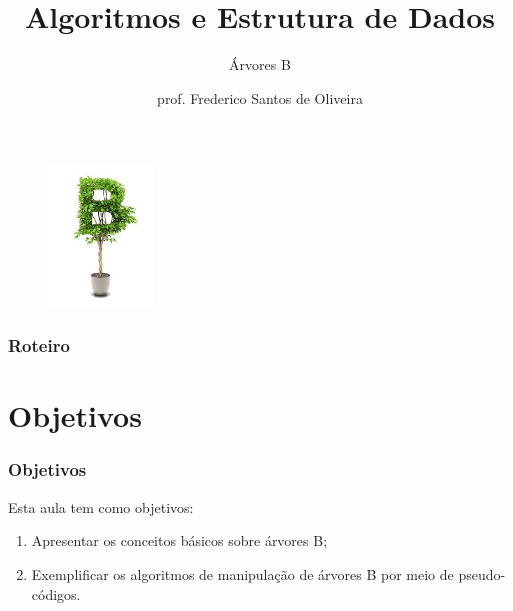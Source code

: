 \documentclass[aspectratio=169]{beamer}
\title[Árvores B]{Algoritmos e Estrutura de Dados}
\subtitle{Árvores B}
\author[Frederico Santos de Oliveira]{prof. Frederico Santos de Oliveira}
\institute[UFMT]{Universidade Federal de Mato Grosso\\ Faculdade de Engenharia}
\date{}
\begin{document}
\begin{frame}
\titlepage %

\begin{figure}[!h]
  \centering
   \includegraphics[width=80pt]{imagens/introducao.jpg}
  \label{fig_introducao}
\end{figure}
\end{frame}


\begin{frame}
\frametitle{Roteiro} %
\tableofcontents %
\end{frame}


\section{Objetivos}

\begin{frame}
\frametitle{Objetivos}
Esta aula tem como objetivos:
\begin{enumerate}
\item Apresentar os conceitos básicos sobre árvores B;
\item Exemplificar os algoritmos de manipulação de árvores B por meio de pseudo-códigos.
\end{enumerate}
\end{frame}
\end{document}

